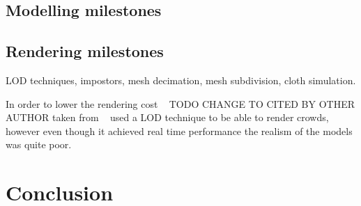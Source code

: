\documentclass[conference]{acmsiggraph}
\begin{document}
\subsection{Modelling milestones}

\subsection{Rendering milestones}

LOD techniques, impostors, mesh decimation, mesh subdivision, cloth simulation.

In order to lower the rendering cost ~\cite{pratt1997humans} TODO CHANGE TO CITED BY OTHER AUTHOR taken from ~\cite{Aubel1999} used a LOD technique to be able to render crowds, however even though it  achieved real time performance the realism of the models was quite poor.



\section{Conclusion}



\end{document}
